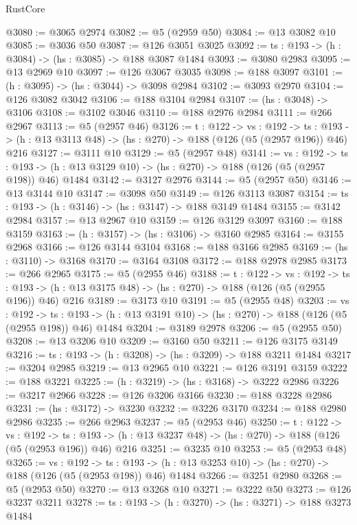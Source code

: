 \begin{lexlean}{RustCore}
\begin{coremodule}
@3080 := @3065 @2974
@3082 := @5 (@2959 @50)
@3084 := @13 @3082 @10
@3085 := @3036 @50
@3087 := @126 @3051 @3025
@3092 := {ts : @193} -> (h : @3084) -> (hs : @3085) -> @188 @3087 @1484
@3093 := @3080 @2983
@3095 := @13 @2969 @10
@3097 := @126 @3067 @3035
@3098 := @188 @3097
@3101 := (h : @3095) -> (hs : @3044) -> @3098 @2984
@3102 := @3093 @2970
@3104 := @126 @3082 @3042
@3106 := @188 @3104 @2984
@3107 := (hs : @3048) -> @3106
@3108 := @3102 @3046
@3110 := @188 @2976 @2984
@3111 := @266 @2967
@3113 := @5 (@2957 @46)
@3126 := {t : @122} ->
  {vs : @192} ->
  {ts : @193} -> (h : @13 @3113 @48) -> (hs : @270) -> @188 (@126 (@5 (@2957 @196)) @46) @216
@3127 := @3111 @10
@3129 := @5 (@2957 @48)
@3141 := {vs : @192} ->
  {ts : @193} -> (h : @13 @3129 @10) -> (hs : @270) -> @188 (@126 (@5 (@2957 @198)) @46) @1484
@3142 := @3127 @2976
@3144 := @5 (@2957 @50)
@3146 := @13 @3144 @10
@3147 := @3098 @50
@3149 := @126 @3113 @3087
@3154 := {ts : @193} -> (h : @3146) -> (hs : @3147) -> @188 @3149 @1484
@3155 := @3142 @2984
@3157 := @13 @2967 @10
@3159 := @126 @3129 @3097
@3160 := @188 @3159
@3163 := (h : @3157) -> (hs : @3106) -> @3160 @2985
@3164 := @3155 @2968
@3166 := @126 @3144 @3104
@3168 := @188 @3166 @2985
@3169 := (hs : @3110) -> @3168
@3170 := @3164 @3108
@3172 := @188 @2978 @2985
@3173 := @266 @2965
@3175 := @5 (@2955 @46)
@3188 := {t : @122} ->
  {vs : @192} ->
  {ts : @193} -> (h : @13 @3175 @48) -> (hs : @270) -> @188 (@126 (@5 (@2955 @196)) @46) @216
@3189 := @3173 @10
@3191 := @5 (@2955 @48)
@3203 := {vs : @192} ->
  {ts : @193} -> (h : @13 @3191 @10) -> (hs : @270) -> @188 (@126 (@5 (@2955 @198)) @46) @1484
@3204 := @3189 @2978
@3206 := @5 (@2955 @50)
@3208 := @13 @3206 @10
@3209 := @3160 @50
@3211 := @126 @3175 @3149
@3216 := {ts : @193} -> (h : @3208) -> (hs : @3209) -> @188 @3211 @1484
@3217 := @3204 @2985
@3219 := @13 @2965 @10
@3221 := @126 @3191 @3159
@3222 := @188 @3221
@3225 := (h : @3219) -> (hs : @3168) -> @3222 @2986
@3226 := @3217 @2966
@3228 := @126 @3206 @3166
@3230 := @188 @3228 @2986
@3231 := (hs : @3172) -> @3230
@3232 := @3226 @3170
@3234 := @188 @2980 @2986
@3235 := @266 @2963
@3237 := @5 (@2953 @46)
@3250 := {t : @122} ->
  {vs : @192} ->
  {ts : @193} -> (h : @13 @3237 @48) -> (hs : @270) -> @188 (@126 (@5 (@2953 @196)) @46) @216
@3251 := @3235 @10
@3253 := @5 (@2953 @48)
@3265 := {vs : @192} ->
  {ts : @193} -> (h : @13 @3253 @10) -> (hs : @270) -> @188 (@126 (@5 (@2953 @198)) @46) @1484
@3266 := @3251 @2980
@3268 := @5 (@2953 @50)
@3270 := @13 @3268 @10
@3271 := @3222 @50
@3273 := @126 @3237 @3211
@3278 := {ts : @193} -> (h : @3270) -> (hs : @3271) -> @188 @3273 @1484

\end{coremodule}
\end{lexlean}
